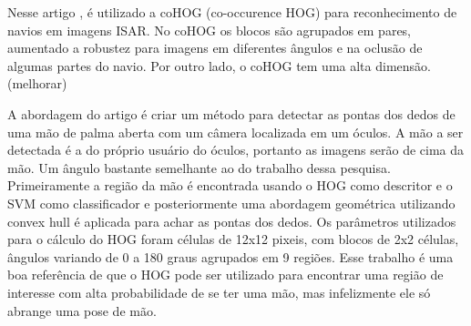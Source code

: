 Nesse artigo \cite{kawahara2012automatic}, é utilizado a coHOG (co-occurence HOG) para reconhecimento de navios em imagens ISAR. No coHOG os blocos são agrupados em pares, aumentado a robustez para imagens em diferentes ângulos e na oclusão de algumas partes do navio. Por outro lado, o coHOG tem uma alta dimensão. (melhorar)


A abordagem do artigo \cite{jiang2012robust} é criar um método para detectar as pontas dos dedos de uma mão de palma aberta com um câmera localizada em um óculos. A mão a ser detectada é a do próprio usuário do óculos, portanto as imagens serão de cima da mão. Um ângulo bastante semelhante ao do trabalho dessa pesquisa. Primeiramente a região da mão é encontrada usando o HOG como descritor e o SVM como classificador e posteriormente uma abordagem geométrica utilizando convex hull é aplicada para achar as pontas dos dedos. Os parâmetros utilizados para o cálculo do HOG foram células de 12x12 pixeis, com blocos de 2x2 células, ângulos variando de 0 a 180 graus agrupados em 9 regiões. Esse trabalho é uma boa referência de que o HOG pode ser utilizado para encontrar uma região de interesse com alta probabilidade de se ter uma mão, mas infelizmente ele só abrange uma pose de mão.


